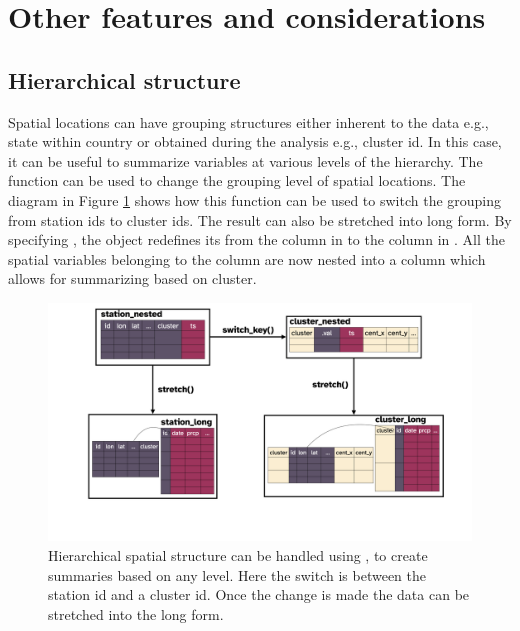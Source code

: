 \documentclass[
  shortnames]{jss}
\begin{document}
\hypertarget{others}{%
\section{Other features and considerations}\label{others}}

\hypertarget{hierarchical-structure}{%
\subsection{Hierarchical structure}\label{hierarchical-structure}}

Spatial locations can have grouping structures either inherent to the data e.g., state within country or obtained during the analysis e.g., cluster id. In this case, it can be useful to summarize variables at various levels of the hierarchy. The function  can be used to change the grouping level of spatial locations. The diagram in Figure \ref{fig:illu-hier} shows how this function can be used to switch the grouping from station ids to cluster ids. The result can also be stretched into long form. By specifying , the  object redefines its  from the  column in  to the  column in . All the spatial variables belonging to the  column are now nested into a  column which allows for summarizing based on cluster.

\begin{CodeChunk}
\begin{figure}

{\centering \includegraphics[width=1\linewidth,height=0.4\textheight]{../figures/diagram-keynotes/diagram-keynotes.003} 

}

\caption[Hierarchical spatial structure can be handled using , to create summaries based on any level]{Hierarchical spatial structure can be handled using , to create summaries based on any level. Here the switch is between the station id and a cluster id. Once the change is made the data can be stretched into the long form.}\label{fig:illu-hier}
\end{figure}
\end{CodeChunk}
\end{document}
